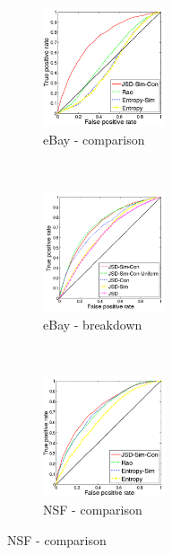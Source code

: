 \documentclass{article} %
\begin{document}
\begin{figure}
        \centering
        \begin{subfigure}[b]{0.24\textwidth}
                \centering
                \includegraphics[width=36mm]{figures/phonecases-comparison-kopia.png}
               \caption{eBay - comparison}
                \label{fig:phonecases-comparison}
        \end{subfigure}%
              ~ %
        \begin{subfigure}[b]{0.24\textwidth}
                \centering
                \includegraphics[width=36mm]{figures/phonecases-breakdown-kopia.png}
                \caption{eBay - breakdown}
                \label{fig:phonecases-breakdown}
        \end{subfigure}\nobreak
              ~ %
        \begin{subfigure}[b]{0.24\textwidth}
                \centering
                \includegraphics[width=36mm]{figures/nsf-comparison-kopia.png}
                \caption{NSF - comparison}
                \label{fig:nsf-comparison}
        \end{subfigure}%

\end{figure}
\end{document}
